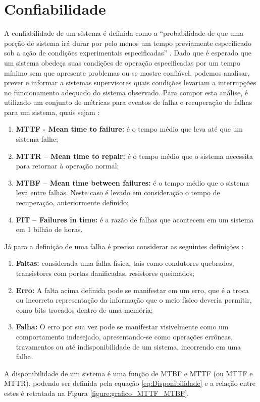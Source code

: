 \section{Confiabilidade}
A confiabilidade de um sistema é definida como a ``probabilidade de que uma porção de sistema irá durar por pelo menos um tempo previamente especificado sob a ação de condições experimentais especificadas'' \cite{Maricau2013}.
Dado que é esperado que um sistema obedeça suas condições de operação especificadas por um tempo mínimo sem que apresente problemas ou se mostre confiável, podemos analisar, prever e informar a sistemas supervisores quais condições levariam a interrupções no funcionamento adequado do sistema observado.
Para compor esta análise, é utilizado um conjunto de métricas para eventos de falha e recuperação de falhas para um sistema, quais sejam \cite{Sorin2009}\cite{Seymour1993}:
\begin{enumerate} 
\item \textbf{MTTF - Mean time to failure:} é o tempo médio que leva até que um sistema falhe;\item \textbf{MTTR – Mean time to repair:} é o tempo médio que o sistema necessita para retornar à operação normal;\item \textbf{MTBF – Mean time between failures:} é o tempo médio que o sistema leva entre falhas. Neste caso é levado em consideração o tempo de recuperação, anteriormente definido;\item \textbf{FIT – Failures in time:} é a razão de falhas que acontecem em um sistema em 1 bilhão de horas.
\end{enumerate}
Já para a definição de uma falha é preciso considerar as seguintes definições \cite{Sorin2009}:
\begin{enumerate}
\item \textbf{Faltas:} considerada uma falha física, tais como condutores quebrados, transistores com portas danificadas, resistores queimados;\item \textbf{Erro:} A falta acima definida pode se manifestar em um erro, que é a troca ou incorreta representação da informação que o meio físico deveria permitir, como bits trocados dentro de uma memória;\item \textbf{Falha:} O erro por sua vez pode se manifestar visivelmente como um comportamento indesejado, apresentando-se como operações errôneas, travamentos ou até indisponibilidade de um sistema, incorrendo em uma falha.
\end{enumerate}
A disponibilidade de um sistema é uma função de MTBF e MTTF (ou MTTF e MTTR), podendo ser definida pela equação \ref{eq:Disponibilidade} e a relação entre estes é retratada na Figura \ref{figure:grafico_MTTF_MTBF}.

